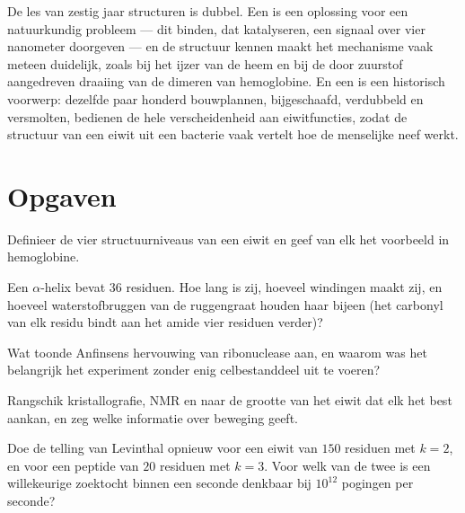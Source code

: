 \begin{remark}\label{rem:b3:structural-biology:sf}
De les van zestig jaar structuren is dubbel. Een  is een
oplossing voor een natuurkundig probleem --- dit binden, dat
katalyseren, een signaal over vier nanometer doorgeven --- en de
structuur kennen maakt het mechanisme vaak meteen duidelijk, zoals bij
het ijzer van de heem en bij de door zuurstof aangedreven draaiing van
de dimeren van hemoglobine. En een  is een historisch voorwerp:
dezelfde paar honderd bouwplannen, bijgeschaafd, verdubbeld en
versmolten, bedienen de hele verscheidenheid aan eiwitfuncties, zodat
de structuur van een eiwit uit een bacterie vaak vertelt hoe de
menselijke neef werkt.
\end{remark}

\section{Opgaven}

\begin{exercise}[$\star$]\label{exo:b3:structural-biology:1}
Definieer de vier structuurniveaus van een eiwit en geef van elk het
voorbeeld in hemoglobine.
\end{exercise}

\begin{exercise}[$\star$]\label{exo:b3:structural-biology:2}
Een $\alpha$-helix bevat $36$ residuen. Hoe lang is zij, hoeveel
windingen maakt zij, en hoeveel waterstofbruggen van de ruggengraat
houden haar bijeen (het carbonyl van elk residu bindt aan het amide
vier residuen verder)?
\end{exercise}

\begin{exercise}[$\star$]\label{exo:b3:structural-biology:3}
Wat toonde Anfinsens hervouwing van ribonuclease aan, en waarom was het
belangrijk het experiment zonder enig celbestanddeel uit te voeren?
\end{exercise}

\begin{exercise}[$\star$]\label{exo:b3:structural-biology:4}
Rangschik kristallografie, NMR en  naar de
grootte van het eiwit dat elk het best aankan, en zeg welke informatie
over beweging geeft.
\end{exercise}

\begin{exercise}[$\star\star$]\label{exo:b3:structural-biology:5}
Doe de telling van Levinthal opnieuw voor een eiwit van $150$ residuen
met $k = 2$, en voor een peptide van $20$ residuen met $k = 3$. Voor
welk van de twee is een willekeurige zoektocht binnen een seconde
denkbaar bij $10^{12}$ pogingen per seconde?
\end{exercise}


